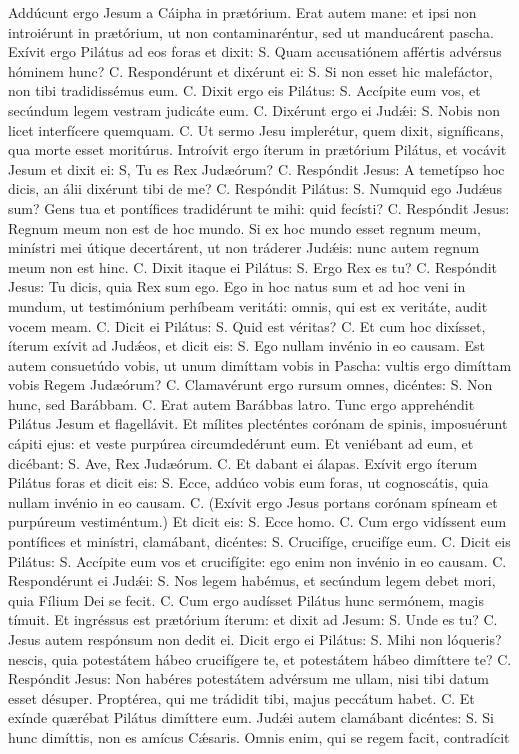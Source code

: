 \begin{paracol}{2}
{Addúcunt ergo Jesum a Cáipha in prætórium. Erat autem mane: et ipsi non introiérunt in prætórium, ut non contaminaréntur, sed ut manducárent pascha. Exívit ergo Pilátus ad eos foras et dixit: {\redx S.} Quam accusatiónem affértis advérsus hóminem hunc? {\redx C.} Respondérunt et dixérunt ei: {\redx S.} Si non esset hic malefáctor, non tibi tradidissémus eum. {\redx C.} Dixit ergo eis Pilátus: {\redx S.} Accípite eum vos, et secúndum legem vestram judicáte eum. {\redx C.} Dixérunt ergo ei Judǽi: {\redx S.} Nobis non licet interfícere quemquam. {\redx C.} Ut sermo Jesu implerétur, quem dixit, signíficans, qua morte esset moritúrus. Introívit ergo íterum in prætórium Pilátus, et vocávit Jesum et dixit ei: S, Tu es Rex Judæórum? {\redx C.} Respóndit Jesus: \cruz A temetípso hoc dicis, an álii dixérunt tibi de me? {\redx C.} Respóndit Pilátus: {\redx S.} Numquid ego Judǽus sum? Gens tua et pontífices tradidérunt te mihi: quid fecísti? {\redx C.} Respóndit Jesus: \cruz Regnum meum non est de hoc mundo. Si ex hoc mundo esset regnum meum, minístri mei útique decertárent, ut non tráderer Judǽis: nunc autem regnum meum non est hinc. {\redx C.} Dixit itaque ei Pilátus: {\redx S.} Ergo Rex es tu? {\redx C.} Respóndit Jesus: \cruz Tu dicis, quia Rex sum ego. Ego in hoc natus sum et ad hoc veni in mundum, ut testimónium perhíbeam veritáti: omnis, qui est ex veritáte, audit vocem meam. {\redx C.} Dicit ei Pilátus: {\redx S.} Quid est véritas? {\redx C.} Et cum hoc dixísset, íterum exívit ad Judǽos, et dicit eis: {\redx S.} Ego nullam invénio in eo causam. Est autem consuetúdo vobis, ut unum dimíttam vobis in Pascha: vultis ergo dimíttam vobis Regem Judæórum? {\redx C.} Clamavérunt ergo rursum omnes, dicéntes: {\redx S.} Non hunc, sed Barábbam. {\redx C.} Erat autem Barábbas latro. Tunc ergo apprehéndit Pilátus Jesum et flagellávit. Et mílites plecténtes corónam de spinis, imposuérunt cápiti ejus: et veste purpúrea circumdedérunt eum. Et veniébant ad eum, et dicébant: {\redx S.} Ave, Rex Judæórum. {\redx C.} Et dabant ei álapas. Exívit ergo íterum Pilátus foras et dicit eis: {\redx S.} Ecce, addúco vobis eum foras, ut cognoscátis, quia nullam invénio in eo causam. {\redx C.} (Exívit ergo Jesus portans corónam spíneam et purpúreum vestiméntum.) Et dicit eis: {\redx S.} Ecce homo. {\redx C.} Cum ergo vidíssent eum pontífices et minístri, clamábant, dicéntes: {\redx S.} Crucifíge, crucifíge eum. {\redx C.} Dicit eis Pilátus: {\redx S.} Accípite eum vos et crucifígite: ego enim non invénio in eo causam. {\redx C.} Respondérunt ei Judǽi: {\redx S.} Nos legem habémus, et secúndum legem debet mori, quia Fílium Dei se fecit. {\redx C.} Cum ergo audísset Pilátus hunc sermónem, magis tímuit. Et ingréssus est prætórium íterum: et dixit ad Jesum: {\redx S.} Unde es tu? {\redx C.} Jesus autem respónsum non dedit ei. Dicit ergo ei Pilátus: {\redx S.} Mihi non lóqueris? nescis, quia potestátem hábeo crucifígere te, et potestátem hábeo dimíttere te? {\redx C.} Respóndit Jesus: \cruz Non habéres potestátem advérsum me ullam, nisi tibi datum esset désuper. Proptérea, qui me trádidit tibi, majus peccátum habet. {\redx C.} Et exínde quærébat Pilátus dimíttere eum. Judǽi autem clamábant dicéntes: {\redx S.} Si hunc dimíttis, non es amícus Cǽsaris. Omnis enim, qui se regem facit, contradícit }
\end{paracol}
